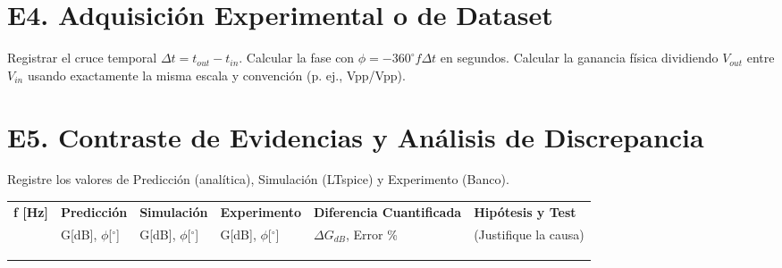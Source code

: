 \documentclass[11pt, a4paper]{article}
\begin{document}
\section*{E4. Adquisición Experimental o de Dataset}
Registrar el cruce temporal $\Delta t = t_{out} - t_{in}$. Calcular la fase con $\phi = -360^\circ f \Delta t$ en segundos. Calcular la ganancia física dividiendo $V_{out}$ entre $V_{in}$ usando exactamente la misma escala y convención (p. ej., Vpp/Vpp).
\begin{center}
\end{center}

\section*{E5. Contraste de Evidencias y Análisis de Discrepancia}
Registre los valores de Predicción (analítica), Simulación (LTspice) y Experimento (Banco).
\begin{center}
\begin{tabularx}{\textwidth}{@{}l l l l X X@{}}
\toprule
\textbf{f [Hz]} & \textbf{Predicción} & \textbf{Simulación} & \textbf{Experimento} & \textbf{Diferencia Cuantificada} & \textbf{Hipótesis y Test} \\ 
 & G[dB], $\phi$[$^\circ$] & G[dB], $\phi$[$^\circ$] & G[dB], $\phi$[$^\circ$] & $\Delta G_{dB}$, Error \% & (Justifique la causa)\\ \midrule
& & & & & \\ \addlinespace[20pt]
& & & & & \\ \addlinespace[20pt]
& & & & & \\ \bottomrule
\end{tabularx}
\end{center}
\end{document}
